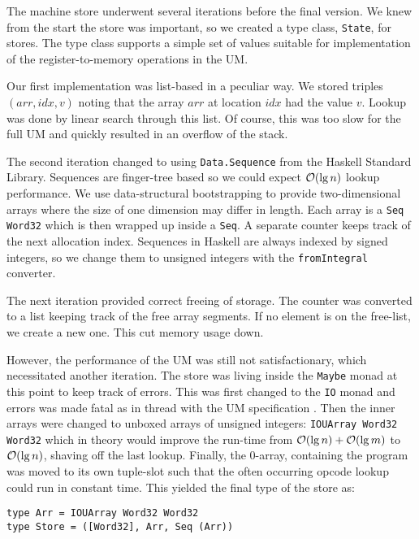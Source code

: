 The machine store underwent several iterations before the final version. We
knew from the start the store was important, so we created a type
class, \texttt{State}, for stores. The type class supports a simple
set of values suitable for implementation of the register-to-memory
operations in the UM.

Our first implementation was list-based in a peculiar way. We stored
triples $(arr, idx, v)$ noting that the array $arr$ at location $idx$
had the value $v$. Lookup was done by linear search through this
list.  Of course, this was too slow for the
full UM and quickly resulted in an overflow of the stack.

The second iteration changed to using \texttt{Data.Sequence} from the
Haskell Standard Library. Sequences are finger-tree based so we could
expect $\mathcal{O}(\lg n)$ lookup performance. We use data-structural
bootstrapping \cite{okasaki+pfds} to provide two-dimensional arrays
where the size of one dimension may differ in length. Each array is a
\texttt{Seq Word32} which is then wrapped up inside a \texttt{Seq}. A
separate counter keeps track of the next allocation index. Sequences
in Haskell are always indexed by signed integers, so we change them to
unsigned integers with the \texttt{fromIntegral} converter.

The next iteration provided correct freeing of storage. The counter
was converted to a list keeping track of the free array segments. If
no element is on the free-list, we create a new one. This cut memory
usage down.

However, the performance of the UM was still not satisfactionary, which
necessitated another iteration. The store was living inside the \texttt{Maybe}
monad at this point to keep track of errors. This was first changed to the
\texttt{IO} monad and errors was made fatal as in thread with the UM
specification \cite{um+spec}. Then the inner arrays were changed to
unboxed arrays of unsigned integers: \texttt{IOUArray Word32 Word32}
which in theory would improve the run-time from $\mathcal{O}(\lg n) + \mathcal{O}(\lg
  m)$ to $\mathcal{O}(\lg n)$, shaving off the last lookup. Finally, the
$0$-array, containing the program was moved to its own tuple-slot such
that the often occurring opcode lookup could run in constant
time. This yielded the final type of the store as:
\begin{verbatim}
type Arr = IOUArray Word32 Word32
type Store = ([Word32], Arr, Seq (Arr))
\end{verbatim}

